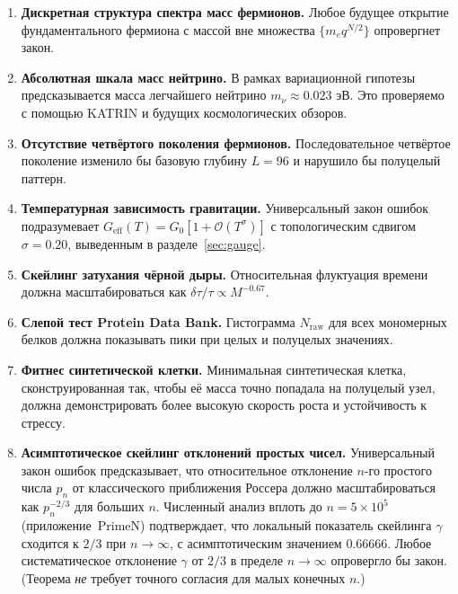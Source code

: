 \documentclass[12pt,a4paper]{article}
\theoremstyle{remark}
\begin{document}
	\begin{enumerate}[label=(\arabic*)]
		\item \textbf{Дискретная структура спектра масс фермионов.} Любое будущее открытие фундаментального фермиона с массой вне множества \(\{m_e q^{N/2}\}\) опровергнет закон.
		\item \textbf{Абсолютная шкала масс нейтрино.} В рамках вариационной гипотезы \cite{AppendixLambda} предсказывается масса легчайшего нейтрино \(m_{\nu} \approx 0.023\) эВ. Это проверяемо с помощью KATRIN и будущих космологических обзоров.
		\item \textbf{Отсутствие четвёртого поколения фермионов.} Последовательное четвёртое поколение изменило бы базовую глубину \(L = 96\) и нарушило бы полуцелый паттерн.
		\item \textbf{Температурная зависимость гравитации.} Универсальный закон ошибок подразумевает \(G_{\mathrm{eff}}(T) = G_0[1 + \mathcal{O}(T^{\sigma})]\) с топологическим сдвигом \(\sigma = 0.20\), выведенным в разделе~\ref{sec:gauge}.
		\item \textbf{Скейлинг затухания чёрной дыры.} Относительная флуктуация времени должна масштабироваться как \(\delta\tau/\tau \propto M^{-0.67}\).
		\item \textbf{Слепой тест Protein Data Bank.} Гистограмма \(N_{\mathrm{raw}}\) для всех мономерных белков должна показывать пики при целых и полуцелых значениях.
		\item \textbf{Фитнес синтетической клетки.} Минимальная синтетическая клетка, сконструированная так, чтобы её масса точно попадала на полуцелый узел, должна демонстрировать более высокую скорость роста и устойчивость к стрессу.
		\item \textbf{Асимптотическое скейлинг отклонений простых чисел.} Универсальный закон ошибок предсказывает, что относительное отклонение \(n\)-го простого числа \(p_n\) от классического приближения Россера должно масштабироваться как \(p_n^{-2/3}\) для больших \(n\). Численный анализ вплоть до \(n = 5\times10^5\) (приложение~PrimeN) подтверждает, что локальный показатель скейлинга \(\gamma\) сходится к \(2/3\) при \(n\to\infty\), с асимптотическим значением \(0.66666\). Любое систематическое отклонение \(\gamma\) от \(2/3\) в пределе \(n\to\infty\) опровергло бы закон. (Теорема \emph{не} требует точного согласия для малых конечных \(n\).)
	\end{enumerate}
	
\end{document}
